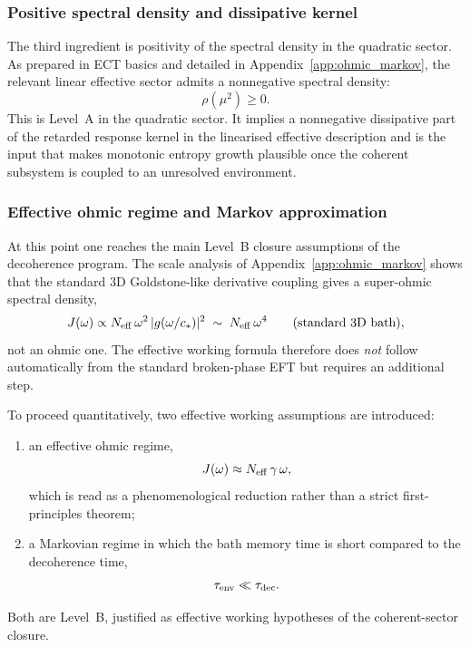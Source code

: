 \documentclass[11pt,a4paper]{article}
\numberwithin{equation}{section}
\begin{document}
\subsubsection*{Positive spectral density and dissipative kernel}

The third ingredient is positivity of the spectral density in the
quadratic sector.
As prepared in ECT basics and detailed in Appendix~\ref{app:ohmic_markov},
the relevant linear effective sector admits a nonnegative spectral
density:
\begin{equation}
  \label{eq:qs_rho_positive}
  \rho(\mu^2) \ge 0.
\end{equation}
This is Level~A in the quadratic sector.
It implies a nonnegative dissipative part of the retarded response
kernel in the linearised effective description and is the input that
makes monotonic entropy growth plausible once the coherent subsystem
is coupled to an unresolved environment.

\subsubsection*{Effective ohmic regime and Markov approximation}

At this point one reaches the main Level~B closure assumptions of the
decoherence program.
The scale analysis of Appendix~\ref{app:ohmic_markov} shows that the
standard 3D Goldstone-like derivative coupling gives a super-ohmic
spectral density,
\begin{equation}
  \label{eq:qs_super_ohmic}
  J(\omega) \propto N_{\rm eff}\,\omega^2\,|g(\omega/c_*)|^2
  \;\sim\; N_{\rm eff}\,\omega^4
  \qquad (\text{standard 3D bath}),
\end{equation}
not an ohmic one.
The effective working formula therefore does \emph{not} follow
automatically from the standard broken-phase EFT but requires an
additional step.

To proceed quantitatively, two effective working assumptions are
introduced:
\begin{enumerate}[label=(\roman*)]
  \item an effective ohmic regime,
    \begin{equation}
      \label{eq:qs_ohmic}
      J(\omega) \approx N_{\rm eff}\,\gamma\,\omega,
    \end{equation}
    which is read as a phenomenological reduction rather than a
    strict first-principles theorem;
  \item a Markovian regime in which the bath memory time is short
    compared to the decoherence time,
    \begin{equation}
      \label{eq:qs_markov}
      \tau_{\rm env} \ll \tau_{\rm dec}.
    \end{equation}
\end{enumerate}
Both are Level~B, justified as effective working hypotheses of the
coherent-sector closure.
\end{document}
